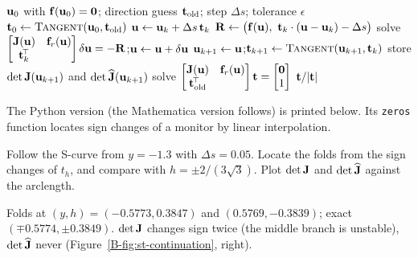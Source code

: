 \begin{algorithm}[ht]
\caption{Pseudo-arclength continuation of $\mat{f}(\mat{u}) = \mat{0}$, $\mat{u} = (\mat{y},r) \in \R^{n+1}$}
\begin{algorithmic}[1]
\Require $\mathbf{u}_0$ with $\mathbf{f}(\mathbf{u}_0) = \mathbf{0}$; direction guess $\mathbf{t}_{\mathrm{old}}$; step $\Delta s$; tolerance $\epsilon$
\State $\mat{t}_0 \gets \Call{Tangent}{\mat{u}_0, \mat{t}_{\mathrm{old}}}$
  \State $\mathbf{u} \gets \mathbf{u}_k + \Delta s\,\mathbf{t}_k$ 
  \Repeat {}
    \State $\mat{R} \gets \bigl(\mat{f}(\mat{u}),\ \mat{t}_k\cdot(\mat{u} - \mat{u}_k) - \Delta s\bigr)$
    \State solve $\begin{bmatrix}\mathbf{J}(\mathbf{u}) & \mathbf{f}_r(\mathbf{u})\\ \mathbf{t}_k^{\!\top}\end{bmatrix}\delta\mathbf{u} = -\mathbf{R}$;\quad $\mathbf{u} \gets \mathbf{u} + \delta\mathbf{u}$
  \State $\mathbf{u}_{k+1} \gets \mathbf{u}$;\quad $\mat{t}_{k+1} \gets \Call{Tangent}{\mat{u}_{k+1}, \mat{t}_k}$
  \State store $\det\mathbf{J}(\mathbf{u}_{k+1})$ and $\det\widehat{\mathbf{J}}(\mathbf{u}_{k+1})$ 
\EndFor
{}
  \State solve $\begin{bmatrix}\mathbf{J}(\mathbf{u}) & \mathbf{f}_r(\mathbf{u})\\ \mathbf{t}_{\mathrm{old}}^{\!\top}\end{bmatrix}\mathbf{t} = \begin{bmatrix}\mathbf{0}\\ 1\end{bmatrix}$
  \State \Return $\mathbf{t}/\lvert \mathbf{t}\rvert$ 
\EndFunction
\end{algorithmic}
\end{algorithm}

\begin{answer}
The Python version (the Mathematica version follows) is printed below. Its
\texttt{zeros} function locates sign changes of a monitor by linear interpolation.


\end{answer}

\qc Follow the S-curve from $y = -1.3$ with $\Delta s = 0.05$. Locate the folds from the
sign changes of $t_h$, and compare with $h = \pm 2/(3\sqrt3)$. Plot $\det\mathbf{J}$ and
$\det\widehat{\mathbf{J}}$ against the arclength.
\begin{answer}
Folds at $(y,h) = (-0.5773, 0.3847)$ and $(0.5769, -0.3839)$; exact
$(\mp0.5774, \pm0.3849)$. $\det\mathbf{J}$ changes sign twice (the middle branch is
unstable), $\det\widehat{\mathbf{J}}$ never (Figure~\ref{B-fig:st-continuation}, right).
\end{answer}

